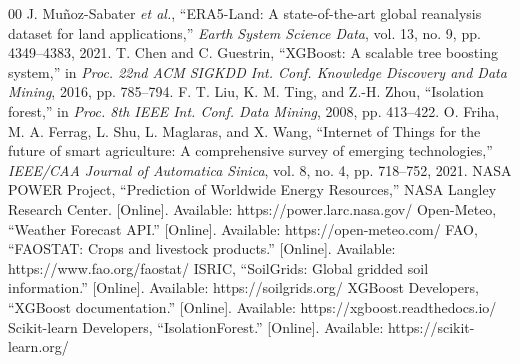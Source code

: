\documentclass[conference,a4paper]{IEEEtran}
\begin{document}
\begin{thebibliography}{00}
 J. Muñoz-Sabater \textit{et al.}, ``ERA5-Land: A state-of-the-art global reanalysis dataset for land applications,'' \textit{Earth System Science Data}, vol. 13, no. 9, pp. 4349--4383, 2021.
 T. Chen and C. Guestrin, ``XGBoost: A scalable tree boosting system,'' in \textit{Proc. 22nd ACM SIGKDD Int. Conf. Knowledge Discovery and Data Mining}, 2016, pp. 785--794.
 F. T. Liu, K. M. Ting, and Z.-H. Zhou, ``Isolation forest,'' in \textit{Proc. 8th IEEE Int. Conf. Data Mining}, 2008, pp. 413--422.
 O. Friha, M. A. Ferrag, L. Shu, L. Maglaras, and X. Wang, ``Internet of Things for the future of smart agriculture: A comprehensive survey of emerging technologies,'' \textit{IEEE/CAA Journal of Automatica Sinica}, vol. 8, no. 4, pp. 718--752, 2021.
 NASA POWER Project, ``Prediction of Worldwide Energy Resources,'' NASA Langley Research Center. [Online]. Available: https://power.larc.nasa.gov/
 Open-Meteo, ``Weather Forecast API.'' [Online]. Available: https://open-meteo.com/
 FAO, ``FAOSTAT: Crops and livestock products.'' [Online]. Available: https://www.fao.org/faostat/
 ISRIC, ``SoilGrids: Global gridded soil information.'' [Online]. Available: https://soilgrids.org/
 XGBoost Developers, ``XGBoost documentation.'' [Online]. Available: https://xgboost.readthedocs.io/
 Scikit-learn Developers, ``IsolationForest.'' [Online]. Available: https://scikit-learn.org/
\end{thebibliography}
\end{document}
